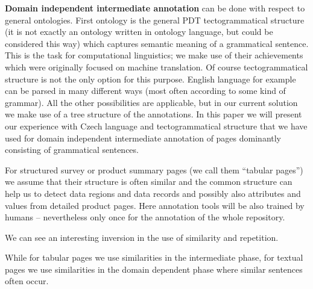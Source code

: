 \documentclass{www2009-submission}
\begin{document}
\textbf{Domain independent intermediate annotation} can be done with respect to general ontologies. First ontology is the general PDT tectogrammatical structure \cite{biblio:MiBeAnnotationtectogrammatical2006} (it is not exactly an ontology written in ontology language, but could be considered this way) which captures semantic meaning of a grammatical sentence. This is the task for computational linguistics; we make use of their achievements which were originally focused on machine translation. Of course tectogrammatical structure is not the only option for this purpose. English language for example can be parsed in many different ways (most often according to some kind of grammar). All the other possibilities are applicable, but in our current solution we make use of a tree structure of the annotations. In this paper we will present our experience with Czech language and tectogrammatical structure that we have used for domain independent intermediate annotation of pages dominantly consisting of grammatical sentences. 

For structured survey or product summary pages (we call them ``tabular pages'') we assume that their structure is often similar and the common structure can help us to detect data regions and data records and possibly also attributes and values from detailed product pages. Here annotation tools will be also trained by humans -- nevertheless only once for the annotation of the whole repository.



We can see an interesting inversion in the use of similarity and repetition. %

While for tabular pages we use similarities in the intermediate phase, for textual pages we use similarities in the domain dependent phase where similar sentences often occur.
\end{document}
